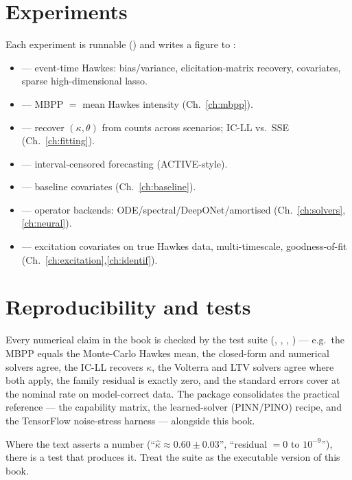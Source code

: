 \section{Experiments}

Each experiment is runnable () and writes a
figure to :

\begin{itemize}[leftmargin=1.4em]
\item {} --- event-time Hawkes: bias/variance, elicitation-matrix
recovery, covariates, sparse high-dimensional lasso.
\item {} --- MBPP $=$ mean Hawkes intensity (Ch.~\ref{ch:mbpp}).
\item {} --- recover $(\kappa,\theta)$ from counts across scenarios; IC-LL
vs.\ SSE (Ch.~\ref{ch:fitting}).
\item {} --- interval-censored forecasting (ACTIVE-style).
\item {} --- baseline covariates (Ch.~\ref{ch:baseline}).
\item {} --- operator backends: ODE/spectral/DeepONet/amortised
(Ch.~\ref{ch:solvers},\ref{ch:neural}).
\item {} --- excitation covariates on true Hawkes data, multi-timescale,
goodness-of-fit (Ch.~\ref{ch:excitation},\ref{ch:identif}).
\end{itemize}

\section{Reproducibility and tests}

Every numerical claim in the book is checked by the test suite
(, ,
, ) --- e.g.\ the MBPP equals the
Monte-Carlo Hawkes mean, the closed-form and numerical solvers agree, the IC-LL
recovers $\kappa$, the Volterra and LTV solvers agree where both apply, the family
residual is exactly zero, and the standard errors cover at the nominal rate on
model-correct data. The package  consolidates the practical
reference --- the capability matrix, the learned-solver (PINN/PINO) recipe, and
the TensorFlow noise-stress harness --- alongside this book.

\begin{whybox}
Where the text asserts a number (``$\hat\kappa\approx0.60\pm0.03$'', ``residual
$=0$ to $10^{-9}$''), there is a test that produces it. Treat the suite as the
executable version of this book.
\end{whybox}

